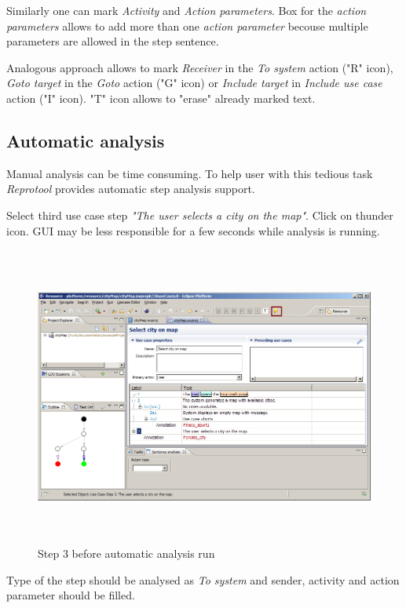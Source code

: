 Similarly one can mark \emph{Activity} and \emph{Action parameters}. Box for the \emph{action parameters} allows to add more than one \emph{action parameter} becouse multiple parameters are
allowed in the step sentence. 

Analogous approach allows to mark \emph{Receiver} in the \emph{To system} action ("R" icon), \emph{Goto target} in the \emph{Goto} action ("G" icon) or \emph{Include target} in \emph{Include use case} action ("I" icon). "T" icon allows to "erase" already marked text.

\subsection{Automatic analysis}

Manual analysis can be time consuming. To help user with this tedious task \emph{Reprotool} provides automatic step analysis support.

Select third use case step \emph{"The user selects a city on the map"}. Click on thunder icon.
GUI may be less responsible for a few seconds while analysis is running.

\begin{figure}[ht]
  \centering
  \includegraphics[height=280pt]{images/manual-analysis/step3-automatic-before}
  \caption{Step 3 before automatic analysis run}
  \label{fig:reprotoolUCEditor}
\end{figure}

Type of the step should be analysed as \emph{To system} and sender, activity and action parameter
should be filled.

